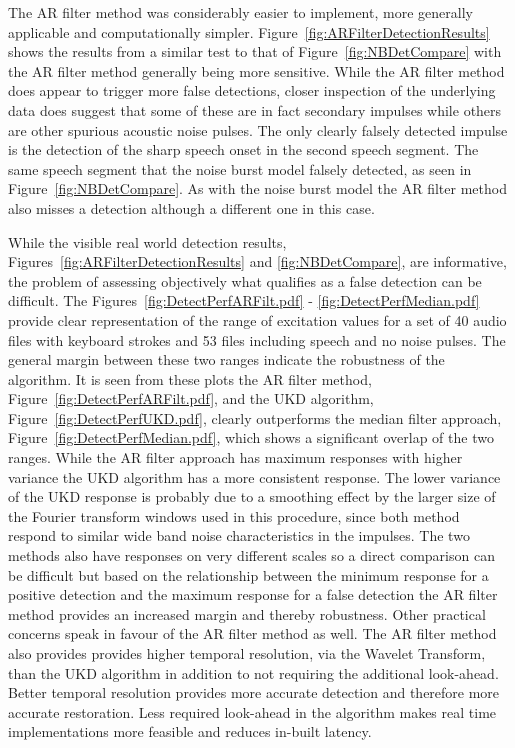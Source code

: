 The AR filter method was considerably easier to implement, more generally applicable and computationally simpler. Figure~\ref{fig:ARFilterDetectionResults} shows the results from a similar test to that of Figure~\ref{fig:NBDetCompare} with the AR filter method generally being more sensitive. While the AR filter method does appear to trigger more false detections, closer inspection of the underlying data does suggest that some of these are in fact secondary impulses while others are other spurious acoustic noise pulses. The only clearly falsely detected impulse is the detection of the sharp speech onset in the second speech segment. The same speech segment that the noise burst model falsely detected, as seen in Figure~\ref{fig:NBDetCompare}. As with the noise burst model the AR filter method also misses a detection although a different one in this case.

While the visible real world detection results, Figures~\ref{fig:ARFilterDetectionResults} and \ref{fig:NBDetCompare}, are informative, the problem of assessing objectively what qualifies as a false detection can be difficult. The Figures~\ref{fig:DetectPerfARFilt.pdf} - \ref{fig:DetectPerfMedian.pdf} provide clear representation of the range of excitation values for a set of 40 audio files with keyboard strokes and 53 files including speech and no noise pulses. The general margin between these two ranges indicate the robustness of the algorithm. It is seen from these plots the AR filter method, Figure~\ref{fig:DetectPerfARFilt.pdf}, and the UKD algorithm, Figure~\ref{fig:DetectPerfUKD.pdf}, clearly outperforms the median filter approach, Figure~\ref{fig:DetectPerfMedian.pdf}, which shows a significant overlap of the two ranges. While the AR filter approach has maximum responses with higher variance the UKD algorithm has a more consistent response. The lower variance of the UKD response is probably due to a smoothing effect by the larger size of the Fourier transform windows used in this procedure, since both method respond to similar wide band noise characteristics in the impulses. The two methods also have responses on very different scales so a direct comparison can be difficult but based on the relationship between the minimum response for a positive detection and the maximum response for a false detection the AR filter method provides an increased margin and thereby robustness. Other practical concerns speak in favour of the AR filter method as well. The AR filter method also provides provides higher temporal resolution, via the Wavelet Transform, than the UKD algorithm in addition to not requiring the additional look-ahead. Better temporal resolution provides more accurate detection and therefore more accurate restoration. Less required look-ahead in the algorithm makes real time implementations more feasible and reduces in-built latency.

